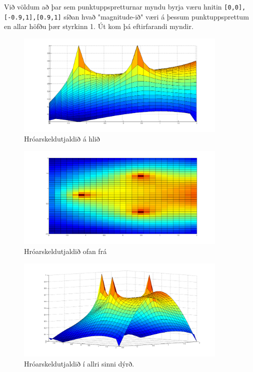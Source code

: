 \documentclass[11pt,a4paper,titlepage]{article}
\begin{document}
 Við völdum að þar sem punktuppspretturnar myndu byrja væru hnitin  \verb|[0,0],[-0.9,1],[0.9,1]|  síðan hvað "magnitude-ið" væri á þessum punktuppsprettum en allar höfðu þær styrkinn 1. Út kom þá eftirfarandi myndir. 
 
 \begin{figure}[h!]
     \centering
     \includegraphics[width=0.9\textwidth]{hroarskelda_hlid.png}
     \caption{Hróarskeldutjaldið á hlið}
     \label{fig:awesome_image9}
 \end{figure}
 
 \begin{figure}[h!]
     \centering
     \includegraphics[width=0.9\textwidth]{hroarskelda_top.png}
     \caption{Hróarskeldutjaldið ofan frá }
     \label{fig:awesome_image10}
 \end{figure}
 
  \begin{figure}[h!]
      \centering
      \includegraphics[width=0.9\textwidth]{hroarskelda_party.png}
      \caption{Hróarskeldutjaldið í allri sinni dýrð.}
      \label{fig:awesome_image11}
  \end{figure}
  \newpage
  
\end{document}
